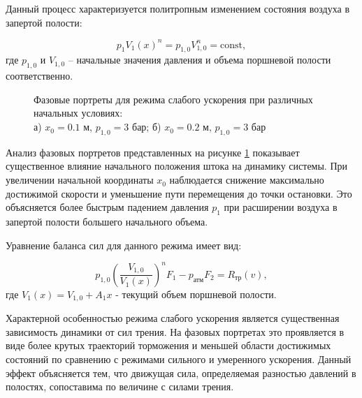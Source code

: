 Данный процесс
характеризуется политропным изменением состояния воздуха в запертой полости:

\begin{equation}
	p_1V_1(x)^n = p_{1,0}V_{1,0}^n = \text{const},
\end{equation}
где $p_{1,0}$ и $V_{1,0}$ -- начальные значения давления и объема поршневой полости соответственно.

\begin{figure}[htbp]
	\caption{Фазовые портреты для режима слабого ускорения при различных начальных условиях:\\
		а) $x_0 = \num{0.1}$ м, $p_{1,0} = 3$ бар; б) $x_0 = \num{0.2}$ м, $p_{1,0} = 3$ бар}
	\label{fig:pp_weak_acceleration}
\end{figure}

Анализ фазовых портретов представленных на рисунке \ref{fig:pp_weak_acceleration} показывает существенное влияние начального
положения штока на динамику системы. При увеличении начальной координаты $x_0$ наблюдается снижение максимально достижимой
скорости и уменьшение пути перемещения до точки остановки. Это объясняется более быстрым падением давления $p_1$ при расширении
воздуха в запертой полости большего начального объема.

Уравнение баланса сил для данного режима имеет вид:

\begin{equation}
	p_{1,0}\left(\frac{V_{1,0}}{V_1(x)}\right)^nF_1 - p_\text{атм}F_2 = R_\text{тр}(v),
\end{equation}
где $V_1(x) = V_{1,0} + A_1x$ - текущий объем поршневой полости.

Характерной особенностью режима слабого ускорения является существенная зависимость динамики
от сил трения. На фазовых портретах это проявляется в виде более крутых траекторий
торможения и меньшей области достижимых состояний по сравнению с режимами сильного и
умеренного ускорения. Данный эффект объясняется тем, что движущая сила, определяемая
разностью давлений в полостях, сопоставима по величине с силами трения.

